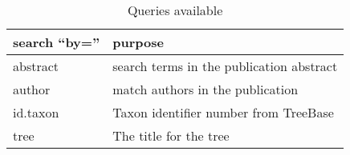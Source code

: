 \documentclass[a4paper]{article}
\begin{document}
\begin{table}
\renewcommand{\arraystretch}{1.35} %
\centering
\begin{tabular}{ll}
\toprule
search ``by='' & purpose\\
\midrule
abstract & search terms in the publication abstract\\
author   & match authors in the publication\\
id.taxon & Taxon identifier number from TreeBase\\
tree     & The title for the tree\\
\bottomrule
\end{tabular}
\caption{Queries available}
\end{table}


\end{document}
